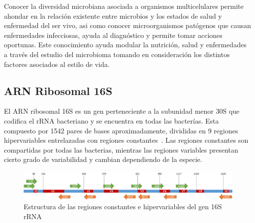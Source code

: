 Conocer la diversidad microbiana asociada a organismos multicelulares permite ahondar en la relación existente entre microbios y los estados de salud y enfermedad del ser vivo, asi como conocer microorganismos patógenos que causan enfermedades infecciosas, ayuda al diagnóstico y permite tomar acciones oportunas. Este conocimiento ayuda modular la nutrición, salud y enfermedades a través del estudio del microbioma tomando en consideración los distintos factores asociados al estilo de vida.
\subsection{ARN Ribosomal 16S}
El ARN ribosomal 16S es un gen perteneciente a la subunidad menor 30S que codifica el rRNA bacteriano y se encuentra en todas las bacterías. 
Esta compuesto por 1542 pares de bases aproximadamente, divididas en 9 regiones hipervariables entrelazadas con regiones constantes~\cite{clarridge2004impact}.
Las regiones constantes son compartidas por todas las bacterias, mientras las regiones variables presentan cierto grado de variabilidad y cambian dependiendo de la especie. 



\begin{figure}[H]
    \centering
    \includegraphics[width=1\linewidth]{images/16S.png}
    \caption{Estructura de las regiones constantes e hipervariables del gen 16S rRNA}
    \label{fig:16S_structure}
\end{figure}

